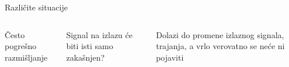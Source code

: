 \begin{frame}[label=08-s062]{Različite situacije}
\gusttekst\begin{columns}[c,onlytextwidth]\centering
{}\centering
Često pogrešno razmišljanje\par\medskip\par
Signal na izlazu će biti isti samo zakašnjen?\par\medskip
\raggedright
Dolazi do promene izlaznog signala, trajanja, a vrlo verovatno se neće ni pojaviti
\end{columns}
\end{frame}
